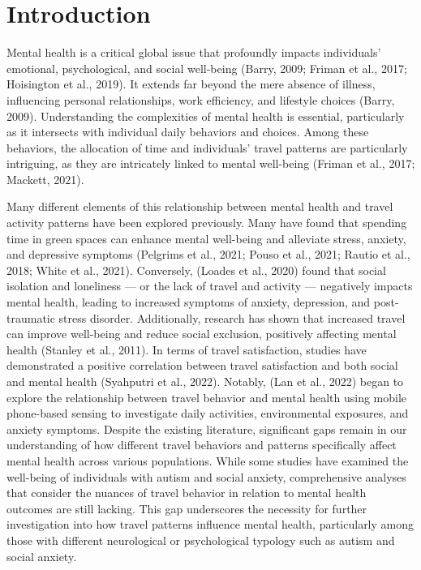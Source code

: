 \documentclass[
  letterpaper,
  number,
  review,
  3p]{elsarticle}
\begin{document}

\section{Introduction}\label{introduction}

Mental health is a critical global issue that profoundly impacts
individuals' emotional, psychological, and social well-being (Barry,
2009; Friman et al., 2017; Hoisington et al., 2019). It extends far
beyond the mere absence of illness, influencing personal relationships,
work efficiency, and lifestyle choices (Barry, 2009). Understanding the
complexities of mental health is essential, particularly as it
intersects with individual daily behaviors and choices. Among these
behaviors, the allocation of time and individuals' travel patterns are
particularly intriguing, as they are intricately linked to mental
well-being (Friman et al., 2017; Mackett, 2021).

Many different elements of this relationship between mental health and
travel activity patterns have been explored previously. Many have found
that spending time in green spaces can enhance mental well-being and
alleviate stress, anxiety, and depressive symptoms (Pelgrims et al.,
2021; Pouso et al., 2021; Rautio et al., 2018; White et al., 2021).
Conversely, (Loades et al., 2020) found that social isolation and
loneliness --- or the lack of travel and activity --- negatively impacts
mental health, leading to increased symptoms of anxiety, depression, and
post-traumatic stress disorder. Additionally, research has shown that
increased travel can improve well-being and reduce social exclusion,
positively affecting mental health (Stanley et al., 2011). In terms of
travel satisfaction, studies have demonstrated a positive correlation
between travel satisfaction and both social and mental health (Syahputri
et al., 2022). Notably, (Lan et al., 2022) began to explore the
relationship between travel behavior and mental health using mobile
phone-based sensing to investigate daily activities, environmental
exposures, and anxiety symptoms. Despite the existing literature,
significant gaps remain in our understanding of how different travel
behaviors and patterns specifically affect mental health across various
populations. While some studies have examined the well-being of
individuals with autism and social anxiety, comprehensive analyses that
consider the nuances of travel behavior in relation to mental health
outcomes are still lacking. This gap underscores the necessity for
further investigation into how travel patterns influence mental health,
particularly among those with different neurological or psychological
typology such as autism and social anxiety.
\end{document}
